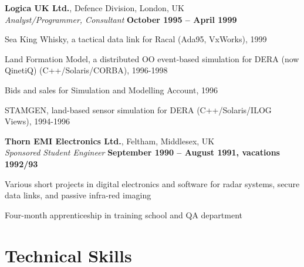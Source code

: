 \documentclass[margin,line]{resume}
\begin{document}
\begin{resume}
    \textbf{Logica UK Ltd.}, Defence Division, London, UK \vspace{2mm}\\\vspace{1mm}%
    \textsl{Analyst/Programmer, Consultant} \hfill \textbf{October 1995 -- April 1999}\vspace{-3mm}\\\vspace{-1mm}%
    \begin{list2}
        \item Sea King Whisky, a tactical data link for Racal (Ada95, VxWorks), 1999
        \item Land Formation Model, a distributed OO event-based simulation for DERA (now QinetiQ) (C++/Solaris/CORBA), 1996-1998
        \item Bids and sales for Simulation and Modelling Account, 1996
        \item STAMGEN, land-based sensor simulation for DERA (C++/Solaris/ILOG Views), 1994-1996
    \end{list2}\vspace{-1.5mm}

    \textbf{Thorn EMI Electronics Ltd.}, Feltham, Middlesex, UK \vspace{2mm}\\\vspace{1mm}%
    \textsl{Sponsored Student Engineer} \hfill \textbf{September 1990 -- August 1991, vacations 1992/93}\vspace{-3mm}\\\vspace{-1mm}%
    \begin{list2}
        \item Various short projects in digital electronics and software for radar systems, 
                  secure data links, and passive infra-red imaging
        \item Four-month apprenticeship in training school and QA department
    \end{list2}\vspace{-1.5mm}


    \section{\mysidestyle Technical Skills} 


\end{resume}
\end{document}
